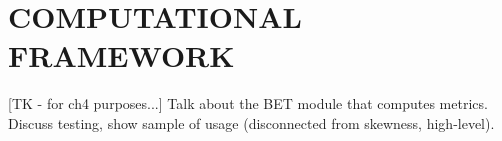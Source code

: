 \chapter{\uppercase{Computational Framework} \label{chapter:02}}





[TK - for ch4 purposes...]
Talk about the BET module that computes metrics.
Discuss testing, show sample of usage (disconnected from skewness, high-level).

\FloatBarrier
